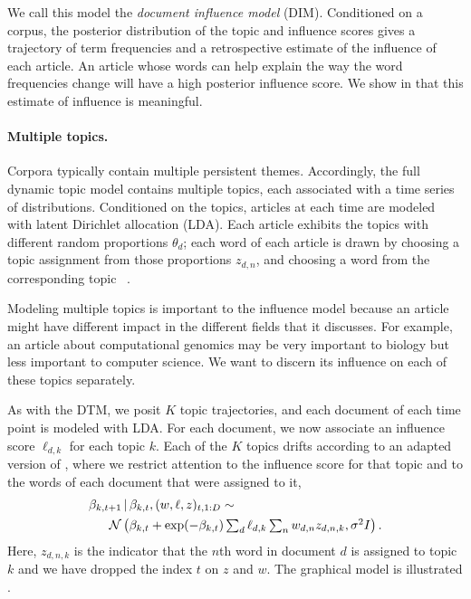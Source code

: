 
We call this model the \textit{document influence model}
(DIM). Conditioned on a corpus, the posterior distribution of the
topic and influence scores gives a trajectory of term frequencies and
a retrospective estimate of the influence of each article.  An article
whose words can help explain the way the word frequencies change will
have a high posterior influence score.  We show in 
that this estimate of influence is meaningful.

\paragraph{Multiple topics.}  Corpora typically contain multiple
persistent themes.  Accordingly, the full dynamic topic model contains
multiple topics, each associated with a time series of distributions.
Conditioned on the topics, articles at each time are modeled
with latent Dirichlet allocation (LDA).  Each article exhibits the
topics with different random proportions $\theta_d$; each word of each
article is drawn by choosing a topic assignment from those proportions
$z_{d,n}$, and choosing a word from the corresponding topic
~\cite{blei:2003}.

Modeling multiple topics is important to the influence model because
an article might have different impact in the different fields that it
discusses.  For example, an article about computational genomics may
be very important to biology but less important to computer science.
We want to discern its influence on each of these topics separately.

As with the DTM, we posit $K$ topic trajectories, and each document of
each time point is modeled with LDA.  For each document, we now
associate an influence score $\ell_{d,k}$ for each topic $k$.  Each of
the $K$ topics drifts according to an adapted version of
, where we restrict attention to the influence
score for that topic and to the words of each document that were
assigned to it,
\begin{equation}
  \begin{split}
    \label{eq:logistic-normal-influence-topics}
    \beta_{k,t+1} & \g \beta_{k,t}, (w, \ell, z)_{t,1:D} \sim \\
    & \hspace{-10pt} \mathcal{N}\left(
      \beta_{k,t} +
      \exp(-\beta_{k,t}) \textstyle \sum_{d} \ell_{d,k} \sum_n w_{d,n} z_{d,n,k},
      \sigma^2 I
    \right).
  \end{split}
\end{equation}
Here, $z_{d,n,k}$ is the indicator that the $n$th word in document $d$
is assigned to topic $k$ and we have dropped the index $t$ on $z$ and
$w$.  The graphical model is illustrated .

